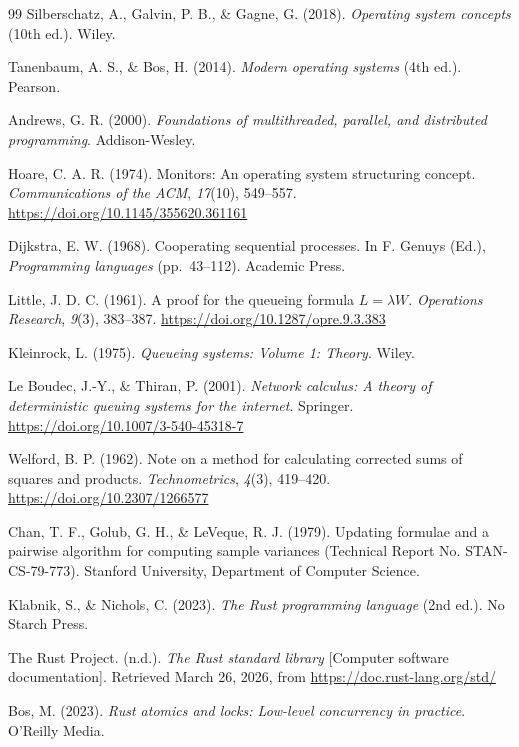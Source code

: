 \documentclass[11pt]{article}
\begin{document}
\begin{thebibliography}{99}
Silberschatz, A., Galvin, P. B., \& Gagne, G. (2018). \emph{Operating system concepts} (10th ed.). Wiley.

Tanenbaum, A. S., \& Bos, H. (2014). \emph{Modern operating systems} (4th ed.). Pearson.

Andrews, G. R. (2000). \emph{Foundations of multithreaded, parallel, and distributed programming}. Addison-Wesley.

Hoare, C. A. R. (1974). Monitors: An operating system structuring concept. \emph{Communications of the ACM}, \emph{17}(10), 549--557. \url{https://doi.org/10.1145/355620.361161}

Dijkstra, E. W. (1968). Cooperating sequential processes. In F. Genuys (Ed.), \emph{Programming languages} (pp.~43--112). Academic Press.

Little, J. D. C. (1961). A proof for the queueing formula \(L=\lambda W\). \emph{Operations Research}, \emph{9}(3), 383--387. \url{https://doi.org/10.1287/opre.9.3.383}

Kleinrock, L. (1975). \emph{Queueing systems: Volume 1: Theory}. Wiley.

Le Boudec, J.-Y., \& Thiran, P. (2001). \emph{Network calculus: A theory of deterministic queuing systems for the internet}. Springer. \url{https://doi.org/10.1007/3-540-45318-7}

Welford, B. P. (1962). Note on a method for calculating corrected sums of squares and products. \emph{Technometrics}, \emph{4}(3), 419--420. \url{https://doi.org/10.2307/1266577}

Chan, T. F., Golub, G. H., \& LeVeque, R. J. (1979). Updating formulae and a pairwise algorithm for computing sample variances (Technical Report No. STAN-CS-79-773). Stanford University, Department of Computer Science.

Klabnik, S., \& Nichols, C. (2023). \emph{The Rust programming language} (2nd ed.). No Starch Press.

The Rust Project. (n.d.). \emph{The Rust standard library} [Computer software documentation]. Retrieved March 26, 2026, from \url{https://doc.rust-lang.org/std/}

Bos, M. (2023). \emph{Rust atomics and locks: Low-level concurrency in practice}. O'Reilly Media.


\end{thebibliography}
\end{document}
